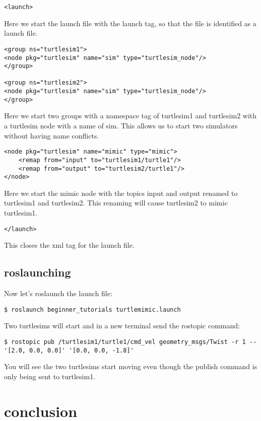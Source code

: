 \begin{lstlisting}[breaklines=true languages=xml]
<launch>
\end{lstlisting}

Here we start the launch file with the launch tag, so that the file is identified as a launch file.

\begin{lstlisting}[breaklines=true languages=xml]
  <group ns="turtlesim1">
<node pkg="turtlesim" name="sim" type="turtlesim_node"/>
</group>

<group ns="turtlesim2">
<node pkg="turtlesim" name="sim" type="turtlesim_node"/>
</group>
\end{lstlisting}

Here we start two groups with a namespace tag of turtlesim1 and turtlesim2 with a turtlesim node with a name of sim. This allows us to start two simulators without having name conflicts.

\begin{lstlisting}[breaklines=true languages=xml]
<node pkg="turtlesim" name="mimic" type="mimic">
	<remap from="input" to="turtlesim1/turtle1"/>
	<remap from="output" to="turtlesim2/turtle1"/>
</node>
\end{lstlisting}

Here we start the mimic node with the topics input and output renamed to turtlesim1 and turtlesim2. This renaming will cause turtlesim2 to mimic turtlesim1.

\begin{lstlisting}[breaklines=true languages=xml]
</launch>
\end{lstlisting}

This closes the xml tag for the launch file.

\subsection{roslaunching}

Now let's roslaunch the launch file:

\begin{lstlisting}[breaklines=true languages=bash]
$ roslaunch beginner_tutorials turtlemimic.launch
\end{lstlisting}

Two turtlesims will start and in a new terminal send the rostopic command:

\begin{lstlisting}[breaklines=true languges=bash]
$ rostopic pub /turtlesim1/turtle1/cmd_vel geometry_msgs/Twist -r 1 -- '[2.0, 0.0, 0.0]' '[0.0, 0.0, -1.8]'
\end{lstlisting}
You will see the two turtlesims start moving even though the publish command is only being sent to turtlesim1.

\section{conclusion}

